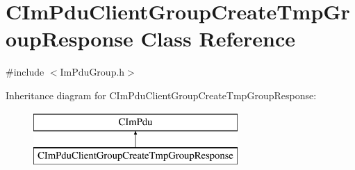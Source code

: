 \hypertarget{class_c_im_pdu_client_group_create_tmp_group_response}{}\section{C\+Im\+Pdu\+Client\+Group\+Create\+Tmp\+Group\+Response Class Reference}
\label{class_c_im_pdu_client_group_create_tmp_group_response}


{\ttfamily \#include $<$Im\+Pdu\+Group.\+h$>$}

Inheritance diagram for C\+Im\+Pdu\+Client\+Group\+Create\+Tmp\+Group\+Response\+:\begin{figure}[H]
\begin{center}
\leavevmode
\includegraphics[height=2.000000cm]{class_c_im_pdu_client_group_create_tmp_group_response}
\end{center}
\end{figure}

